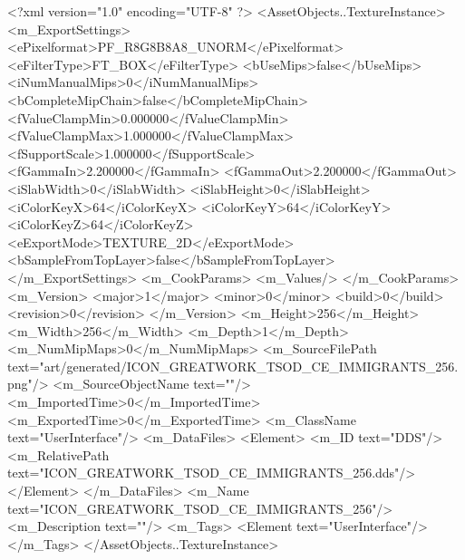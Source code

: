 <?xml version="1.0" encoding="UTF-8" ?>
<AssetObjects..TextureInstance>
	<m_ExportSettings>
		<ePixelformat>PF_R8G8B8A8_UNORM</ePixelformat>
		<eFilterType>FT_BOX</eFilterType>
		<bUseMips>false</bUseMips>
		<iNumManualMips>0</iNumManualMips>
		<bCompleteMipChain>false</bCompleteMipChain>
		<fValueClampMin>0.000000</fValueClampMin>
		<fValueClampMax>1.000000</fValueClampMax>
		<fSupportScale>1.000000</fSupportScale>
		<fGammaIn>2.200000</fGammaIn>
		<fGammaOut>2.200000</fGammaOut>
		<iSlabWidth>0</iSlabWidth>
		<iSlabHeight>0</iSlabHeight>
		<iColorKeyX>64</iColorKeyX>
		<iColorKeyY>64</iColorKeyY>
		<iColorKeyZ>64</iColorKeyZ>
		<eExportMode>TEXTURE_2D</eExportMode>
		<bSampleFromTopLayer>false</bSampleFromTopLayer>
	</m_ExportSettings>
	<m_CookParams>
		<m_Values/>
	</m_CookParams>
	<m_Version>
		<major>1</major>
		<minor>0</minor>
		<build>0</build>
		<revision>0</revision>
	</m_Version>
	<m_Height>256</m_Height>
	<m_Width>256</m_Width>
	<m_Depth>1</m_Depth>
	<m_NumMipMaps>0</m_NumMipMaps>
	<m_SourceFilePath text="art/generated/ICON_GREATWORK_TSOD_CE_IMMIGRANTS_256.png"/>
	<m_SourceObjectName text=""/>
	<m_ImportedTime>0</m_ImportedTime>
	<m_ExportedTime>0</m_ExportedTime>
	<m_ClassName text="UserInterface"/>
	<m_DataFiles>
		<Element>
			<m_ID text="DDS"/>
			<m_RelativePath text="ICON_GREATWORK_TSOD_CE_IMMIGRANTS_256.dds"/>
		</Element>
	</m_DataFiles>
	<m_Name text="ICON_GREATWORK_TSOD_CE_IMMIGRANTS_256"/>
	<m_Description text=""/>
	<m_Tags>
		<Element text="UserInterface"/>
	</m_Tags>
</AssetObjects..TextureInstance>
